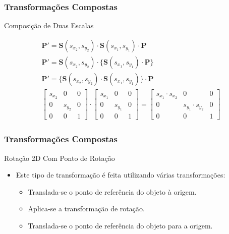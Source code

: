 \documentclass{beamer}
\begin{document}
\begin{frame}
\frametitle{Transformações Compostas}
	\begin{block}{Composição de Duas Escalas}
		
			
		\begin{eqnarray*}
			\textbf{P}' = \textbf{S}(s_{x_2},s_{y_2}) \cdot \textbf{S}(s_{x_1},s_{y_1}) \cdot \textbf{P} \\
			\textbf{P}' = \textbf{S}(s_{x_2},s_{y_2}) \cdot \{ \textbf{S}(s_{x_1},s_{y_1}) \cdot \textbf{P} \} \\
			\textbf{P}' = \{ \textbf{S}(s_{x_2},s_{y_2}) \cdot \textbf{S}(s_{x_1},s_{y_1}) \} \cdot \textbf{P} \\
			\begin{bmatrix}
					s_{x_2}	& 0 			& 0 \\
					0 		& s_{y_2}	& 0 \\
					0		& 0			& 1
			\end{bmatrix}
			\cdot \begin{bmatrix}
					s_{x_1}	& 0 			& 0 \\
					0 		& s_{y_1}	& 0 \\
					0		& 0			& 1
			\end{bmatrix}
			= \begin{bmatrix}
					s_{x_1}\cdot s_{x_2} 	& 0 						& 0 \\
					0 					& s_{y_1}\cdot s_{y_2}	& 0 \\
					0					& 0						& 1
			\end{bmatrix}
		\end{eqnarray*}
				

	\end{block}
\end{frame}


\begin{frame}
\frametitle{Transformações Compostas}
	\begin{block}{Rotação 2D Com Ponto de Rotação}
		\begin{itemize}
			\item Este tipo de transformação é feita utilizando várias transformações:
				\begin{itemize}
					\item Translada-se o ponto de referência do objeto à origem.
					\item Aplica-se a transformação de rotação.
					\item Translada-se o ponto de referência do objeto para a origem.
				\end{itemize}
		\end{itemize}						

	\end{block}
	
\end{frame}
\end{document}
